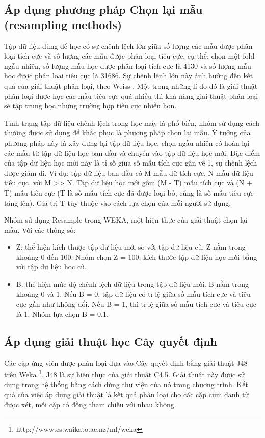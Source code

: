 \documentclass[12pt]{report}
\begin{document}
			\subsection*{Áp dụng phương pháp Chọn lại mẫu (resampling methods)}
				\par Tập dữ liệu dùng để học có sự chênh lệch lớn giữa số lượng các mẫu được phân loại tích cực và số lượng các mẫu được phân loại tiêu cực, cụ thể: chọn một fold ngẫu nhiên, số lượng mẫu học được phân loại tích cực là 4130 và số lượng mẫu học được phân loại tiêu cực là 31686. Sự chênh lệnh lớn này ảnh hưởng đến kết quả của giải thuật phân loại, theo Weiss \cite{weiss03}. Một trong những lí do đó là giải thuật phân loại được học các mẫu tiêu cực quá nhiều thì khả năng giải thuật phân loại sẽ tập trung học những trường hợp tiêu cực nhiều hơn.
				\par Tình trạng tập dữ liệu chênh lệch trong học máy là phổ biến, nhóm sử dụng cách thường được sử dụng để khắc phục là phương pháp chọn lại mẫu. Ý tưởng của phương pháp này là xây dựng lại tập dữ liệu học, chọn ngẫu nhiên có hoàn lại các mẫu từ tập dữ liệu học ban đầu và chuyển vào tập dữ liệu học mới. Đặc điểm của tập dữ liệu học mới này là tỉ số giữa số mẫu tích cực gần về 1, sự chênh lệch được giảm đi. Ví dụ: tập dữ liệu ban đầu có M mẫu dữ tích cực, N mẫu dữ liệu tiêu cực, với M >> N. Tập dữ liệu học mới gồm (M - T) mẫu tích cực và (N + T) mẫu tiêu cực (T là số mẫu tích cực đã được loại bỏ, cũng là số mẫu tiêu cực tăng lên). Giá trị T tùy thuộc vào cách lựa chọn của mỗi người sử dụng.
				\par Nhóm sử dụng Resample trong WEKA, một hiện thực của giải thuật chọn lại mẫu. Với các thông số:
				\begin{itemize}
					\item{Z: thể hiện kích thược tập dữ liệu mới so với tập dữ liệu cũ. Z nằm trong khoảng 0 đến 100. Nhóm chọn Z = 100, kích thước tập dữ liệu học mới bằng với tập dữ liệu học cũ.}
					\item{B: thể hiện mức độ chênh lệch dữ liệu trong tập dữ liệu mới. B nằm trong khoảng 0 và 1. Nếu B = 0, tập dữ liệu có tỉ lệ giữa số mẫu tích cực và tiêu cực gần như không đổi. Nếu B = 1, thì tỉ lệ giữa số mẫu tích cực và tiêu cực là 1. Nhóm lựa chọn B = 0.1.}
				\end{itemize}


			\subsection*{Áp dụng giải thuật học Cây quyết định}
				\par Các cặp ứng viên được phân loại dựa vào Cây quyết định bằng giải thuật J48 trên Weka \footnote{http://www.cs.waikato.ac.nz/ml/weka}. J48 là sự hiện thực của giải thuật C4.5. Giải thuật này được sử dụng trong hệ thống bằng cách dùng thư viện của nó trong chương trình. Kết quả của việc áp dụng giải thuật là kết quả phân loại cho các cặp cụm danh từ được xét, mỗi cặp có đồng tham chiếu với nhau không.
\end{document}
